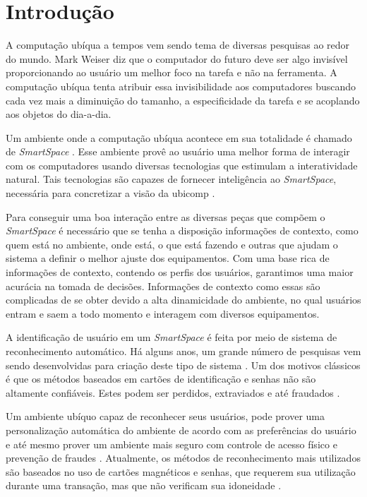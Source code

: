 
\chapter{Introdução}
	
A computação ubíqua a tempos vem sendo tema de diversas pesquisas ao redor do mundo. Mark Weiser diz que o computador do futuro deve ser algo invisível \cite{weiser1, weiser2} proporcionando ao usuário um melhor foco na tarefa e não na ferramenta. A computação ubíqua tenta atribuir essa invisibilidade aos computadores buscando cada vez mais a diminuição do tamanho, a especificidade da tarefa e se acoplando aos objetos do dia-a-dia.

Um ambiente onde a computação ubíqua acontece em sua totalidade é chamado de \textit{SmartSpace} \cite{gregoryabowd}. Esse ambiente provê ao usuário uma melhor forma de interagir com os computadores usando diversas tecnologias que estimulam a interatividade natural. Tais tecnologias são capazes de fornecer inteligência ao \textit{SmartSpace}, necessária para concretizar a visão da ubicomp \cite{fabriciobuzzeto}.

Para conseguir uma boa interação entre as diversas peças que compõem o \textit{SmartSpace} é necessário que se tenha a disposição informações de contexto,  como quem está no ambiente, onde está, o que está fazendo e outras que ajudam o sistema a definir o melhor ajuste dos equipamentos. Com uma base rica de informações de contexto, contendo os perfis dos usuários, garantimos uma maior acurácia na tomada de decisões. Informações de contexto como essas são complicadas de se obter devido a alta dinamicidade do ambiente, no qual usuários entram e saem a todo momento e interagem com diversos equipamentos.

A identificação de usuário em um \textit{SmartSpace} é feita por meio de sistema de reconhecimento automático. Há alguns anos, um grande número de pesquisas vem sendo desenvolvidas para criação deste tipo de sistema  \cite{saocarlos}. Um dos motivos clássicos é que os métodos baseados em cartões de identificação e senhas não são altamente confiáveis. Estes podem ser perdidos, extraviados e até fraudados \cite{bolle}.

Um ambiente ubíquo capaz de reconhecer seus usuários, pode prover uma personalização automática do ambiente de acordo com as preferências do usuário e até mesmo prover um ambiente mais seguro com controle de acesso físico e prevenção de fraudes \cite{saocarlos}. Atualmente, os métodos de reconhecimento mais utilizados são baseados no uso de cartões magnéticos e senhas, que requerem sua utilização durante uma transação, mas que não verificam sua idoneidade \cite{daugman}.

